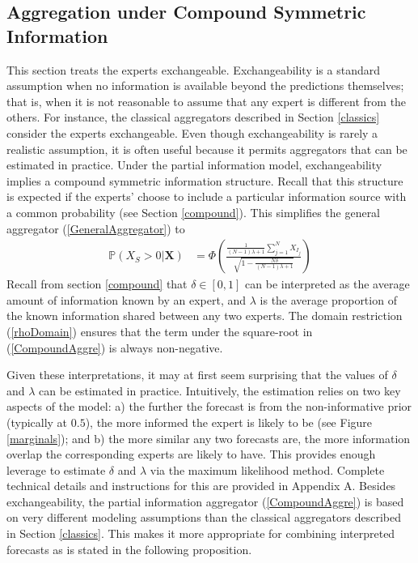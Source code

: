 \documentclass[11pt]{article}
\renewcommand{\P}{\mathbb{P}}
\theoremstyle{definition}
\theoremstyle{definition}
\begin{document}
\subsection{Aggregation under Compound Symmetric Information}
\label{compound2}
This section treats the experts exchangeable. Exchangeability is a standard assumption when no information is available beyond the predictions themselves; that is, when it is not reasonable to assume that any expert is different from the others. For instance, the classical aggregators described in Section \ref{classics} consider the experts exchangeable. Even though exchangeability is rarely a realistic assumption, it is often useful because it permits aggregators that can be estimated in practice.  Under the partial information model, exchangeability implies a compound symmetric information structure. Recall that this structure is expected if the experts' choose to include a particular information source with a common probability (see Section \ref{compound}).
This simplifies the general  aggregator (\ref{GeneralAggregator})  to
\begin{align}
\P\left(X_S > 0 | \boldsymbol{X}\right) &=\Phi\left(\frac{\frac{1}{(N-1)\lambda +1} \sum_{j=1}^N X_{I_j} }{\sqrt{1- \frac{N\delta}{(N-1)\lambda +1} }}  \right) \label{CompoundAggre}
\end{align}
Recall from section \ref{compound} that $\delta \in [0,1]$ can be interpreted as the average amount of information known by an expert, and $\lambda$ is the average proportion of the known information shared between any two experts. The domain restriction (\ref{rhoDomain}) ensures that the term under the square-root in (\ref{CompoundAggre}) is always non-negative.

Given these interpretations, it may at first seem surprising that the values of $\delta$ and $\lambda$ can be estimated in practice. Intuitively, the estimation relies on two key aspects of the model: a) the further the forecast is from the non-informative prior (typically at $0.5$), the more informed the expert is likely to be (see Figure \ref{marginals}); and b) the more similar any two forecasts are, the more information overlap the corresponding experts are likely to have. This provides enough leverage to estimate $\delta$ and $\lambda$   via the maximum likelihood method. Complete technical details and instructions for this are provided in Appendix A. Besides exchangeability, the partial information aggregator (\ref{CompoundAggre}) is based on very different modeling assumptions than the classical aggregators described in Section \ref{classics}. This makes it more appropriate for combining interpreted forecasts as is stated in the following proposition.
\end{document}
